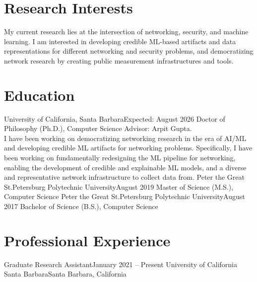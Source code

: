 \documentclass{scv}
\begin{document}

\section{Research Interests}
    \justifying
    My current research lies at the intersection of networking, security, and machine learning. 
    I am interested in developing credible ML-based artifacts and data representations for different networking and security problems, and democratizing network research by creating public measurement infrastructures and tools.

\section{Education}
  \resumeSubHeadingListStart
    \resumeSubheadingWithText
      {University of California, Santa Barbara}{Expected: August 2026}
      {Doctor of Philosophy (Ph.D.), Computer Science}{}
      {Advisor: Arpit Gupta.\\
        I have been working on democratizing networking research in the era of AI/ML and developing credible ML artifacts for networking problems. Specifically, I have been working on fundamentally redesigning the ML pipeline for networking, enabling the development of credible and explainable ML models, and a diverse and representative network infrastructure to collect data from.}{}
    \resumeSubheading
      {Peter the Great St.Petersburg Polytechnic University}{August 2019}
      {Master of Science (M.S.), Computer Science}{}
    \resumeSubheading
      {Peter the Great St.Petersburg Polytechnic University}{August 2017}
      {Bachelor of Science (B.S.), Computer Science}{}
  \resumeSubHeadingListEnd
    
\section{Professional Experience}
  \resumeSubHeadingListStart

    \resumeSubheading 
      {Graduate Research Assistant}{January 2021 -- Present}
      {University of California Santa Barbara}{Santa Barbara, California}
      \resumeItemListStart
      \resumeItemListEnd
    
\end{document}

